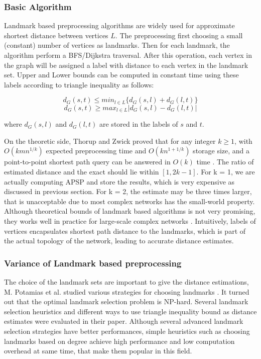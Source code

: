 \subsubsection{Basic Algorithm}

Landmark based preprocessing algorithms are widely used for approximate shortest distance between vertices $L$. The preprocessing first choosing a small (constant) number of vertices as landmarks. Then for each landmark, the algorithm perform a BFS/Dijkstra traversal. After this operation, each vertex in the graph will be assigned a label with distance to each vertex in the landmark set. Upper and Lower bounds can be computed in constant time using these labels according to triangle inequality as follows:

\[
    d_G(s,t) \leq min_{l \in L}\{d_G(s,l)+d_G(l,t)\}
\]
\[
    d_G(s,t) \geq max_{l \in L}|d_G(s,l)-d_G(l,t)|
\]

where $d_G(s,l)$ and $d_G(l,t)$ are stored in the labels of $s$ and $t$. 

On the theoretic side, Thorup and Zwick proved that for any integer $k\geq1$, with $O(kmn^{1/k})$ expected preprocessing time and $O(kn^{1+1/k})$ storage size, and a point-to-point shortest path query can be answered in $O(k)$ time \cite{Thorup:2005:ADO:1044731.1044732}. The ratio of estimated distance and the exact should lie within $[1,2k-1]$. For k = 1, we are actually computing APSP and store the results, which is very expensive as discussed in previous section. For k = 2, the estimate may be three times larger, that is unacceptable due to most complex networks has the small-world property. Although theoretical bounds of landmark based algorithms is not very promising, they works well in practice for large-scale complex networks \cite{Sommer:2014:SQS:2597757.2530531}. Intuitively, labels of vertices encapsulates shortest path distance to the landmarks, which is part of the actual topology of the network, leading to accurate distance estimates.

\subsubsection{Variance of Landmark based preprocessing}

The choice of the landmark sets are important to give the distance estimations, M. Potamias et al. studied various strategies for choosing landmarks \cite{Potamias:2009:FSP:1645953.1646063}. It turned out that the optimal landmark selection problem is NP-hard. Several landmark selection heuristics and different ways to use triangle inequality bound as distance estimates were evaluated in their paper. Although several advanced landmark selection strategies have better performances, simple heuristics such as choosing landmarks based on degree achieve high performance and low computation overhead at same time, that make them popular in this field.

